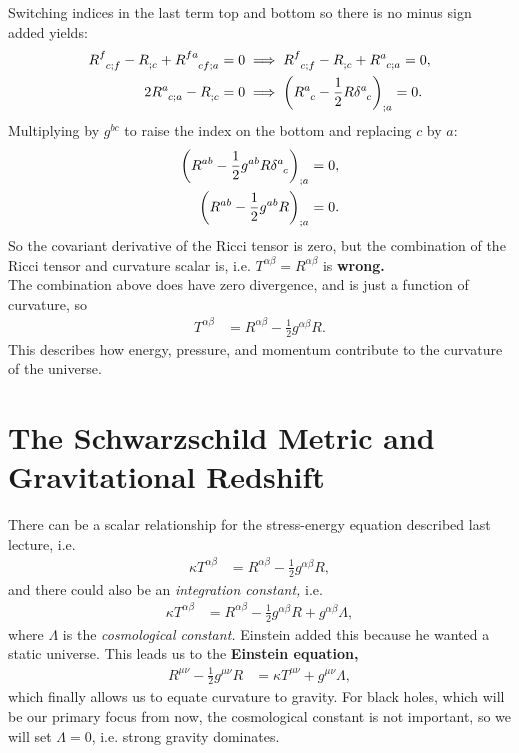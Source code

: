 \documentclass[a4paper, 11pt, normalem]{report}
\begin{document}
Switching indices in the last term top and bottom so there is no minus sign added yields:
\begin{align}
    \tensor{R}{^f_{c;f}} - \tensor{R}{_{;c}} + \tensor{R}{^{fa}_{cf;a}} &= 0 \implies 
    \tensor{R}{^f_{c;f}} - \tensor{R}{_{;c}} + \tensor{R}{^{a}_{c;a}} = 0,\\
    2\tensor{R}{^a_{c;a}} - \tensor{R}{_{;c}} &= 0 \implies
    \left(\tensor{R}{^a_c} - \frac12R\tensor{\delta}{^a_c}\right)_{;a} = 0.
\end{align}
Multiplying by $g^{bc}$ to raise the index on the bottom and replacing $c$ by $a$:
\begin{align}
    \left(R^{ab} - \frac12g^{ab}R\tensor{\delta}{^a_c}\right)_{;a} &= 0,\\
    \left(R^{ab} - \frac12g^{ab}R\right)_{;a} &= 0.
\end{align}
So the covariant derivative of the Ricci tensor is  zero, but the combination of the Ricci tensor and curvature scalar is, i.e. $T^{\alpha\beta}=R^{\alpha\beta}$ is \textbf{wrong.}\\
The combination above does have zero divergence, and is just a function of curvature, so
\begin{align}
    T^{\alpha\beta} &= R^{\alpha\beta} - \frac12g^{\alpha\beta}R.
\end{align}
This describes how energy, pressure, and momentum contribute to the curvature of the universe.

\chapter{The Schwarzschild Metric and Gravitational Redshift}
There can be a scalar relationship for the stress-energy equation described last lecture, i.e.
\begin{align}
    \kappa T^{\alpha\beta} &= R^{\alpha\beta} - \frac12 g^{\alpha\beta}R,
\end{align}
and there could also be an \emph{integration constant,} i.e.
\begin{align}
    \kappa T^{\alpha\beta} &= R^{\alpha\beta} - \frac12g^{\alpha\beta}R + g^{\alpha\beta}\Lambda,
\end{align}
where $\Lambda$ is the \emph{cosmological constant.}
Einstein added this because he wanted a static universe. 
This leads us to the \textbf{Einstein equation,}
\begin{align}
    R^{\mu\nu} - \frac12g^{\mu\nu}R &= \kappa T^{\mu\nu} + g^{\mu\nu}\Lambda,
\end{align}
which finally allows us to equate curvature to gravity. 
For black holes, which will be our primary focus from now, the cosmological constant is not important, so we will set $\Lambda=0$, i.e. strong gravity dominates.
\end{document}
